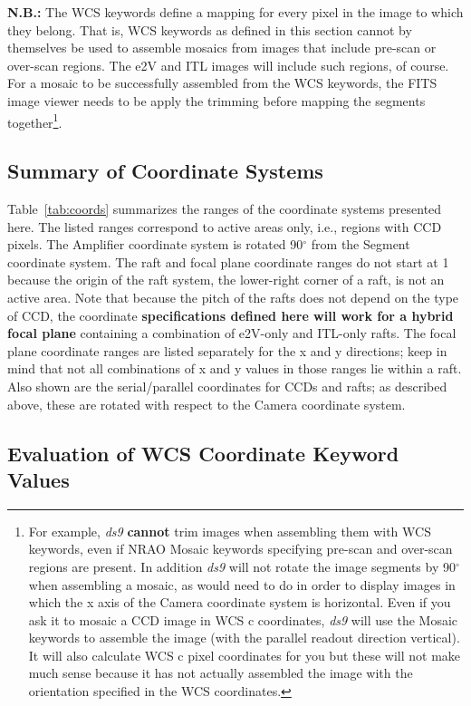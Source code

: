 \documentclass{article}[12pt]
\begin{document}
{\bf N.B.:}  The WCS keywords define a mapping for every pixel in the image to which they belong.  That is, WCS keywords as defined in this section cannot by themselves be used to assemble mosaics from images that include pre-scan or over-scan regions.  The e2V and ITL images will include such regions, of course.  For a mosaic to be successfully assembled from the WCS keywords, the FITS image viewer needs to be apply the trimming before mapping the segments together\footnote{For example, {\it ds9} {\bf cannot} trim images when assembling them with WCS keywords, even if NRAO Mosaic keywords specifying pre-scan and over-scan regions are present.  In addition {\it ds9} will not rotate the image segments by 90$^\circ$ when assembling a mosaic, as would need to do in order to display images in which the x axis of the Camera coordinate system is horizontal.  Even if you ask it to mosaic a CCD image in WCS c coordinates, {\it ds9} will use the Mosaic keywords to assemble the image (with the parallel readout direction vertical).  It will also calculate WCS c pixel coordinates for you but these will not make much sense because it has not actually assembled the image with the orientation specified in the WCS coordinates.}.

\subsection{Summary of Coordinate Systems}
Table~\ref{tab:coords} summarizes the ranges of the coordinate systems presented here.  The listed ranges correspond to active areas only, i.e., regions with CCD pixels.  The Amplifier coordinate system is rotated 90$^\circ$ from the Segment coordinate system.  The raft and focal plane coordinate ranges do not start at 1 because the origin of the raft system, the lower-right corner of a raft, is not an active area.  Note that because the pitch of the rafts does not depend on the type of CCD, the coordinate {\bf specifications defined here will work for a hybrid focal plane} containing a combination of e2V-only and ITL-only rafts.  The focal plane coordinate ranges are listed separately for the x and y directions; keep in mind that not all combinations of x and y values in those ranges lie within a raft.  Also shown are the serial/parallel coordinates for CCDs and rafts; as described above, these are rotated with respect to the Camera coordinate system.

\subsection{Evaluation of WCS Coordinate Keyword Values\label{sec:wcscoords}}
\end{document}

